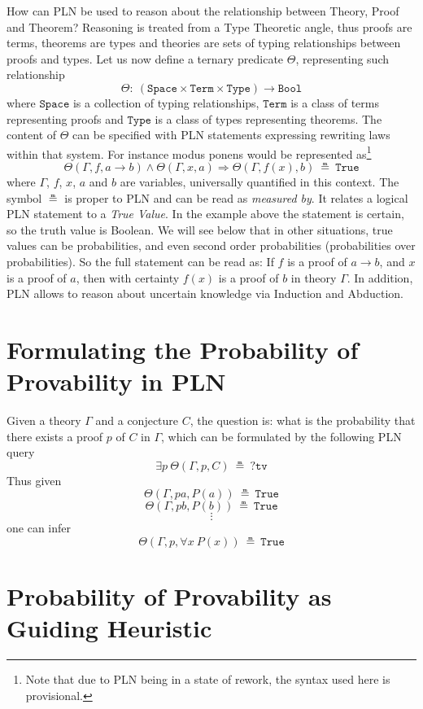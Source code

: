 \documentclass{easychair}
\newcommand{\U}{\Theta}
\newcommand{\Space}{\texttt{Space}}
\newcommand{\Term}{\texttt{Term}}
\newcommand{\Type}{\texttt{Type}}
\newcommand{\Bool}{\texttt{Bool}}
\newcommand{\arrow}{\to}
\newcommand{\limp}{\Rightarrow}
\newcommand{\True}{\texttt{True}}
\begin{document}
How can PLN be used to reason about the relationship between Theory,
Proof and Theorem?  Reasoning is treated from a Type Theoretic angle,
thus proofs are terms, theorems are types and theories are sets of
typing relationships between proofs and types.  Let us now define a
ternary predicate $\U$, representing such relationship
$$\U :\ (\Space \times \Term \times \Type) \arrow \Bool$$ where $\Space$
is a collection of typing relationships, $\Term$ is a class of terms
representing proofs and $\Type$ is a class of types representing
theorems.  The content of $\U$ can be specified with PLN statements
expressing rewriting laws within that system.  For instance modus
ponens would be represented as\footnote{Note that due to PLN being in
a state of rework, the syntax used here is provisional.}
$$\U(\Gamma, f, a \to b) \land \U(\Gamma, x, a) \limp \U(\Gamma, f(x),
b)\ \measeq\ \True$$ where $\Gamma$, $f$, $x$, $a$ and $b$ are
variables, universally quantified in this context.  The symbol
$\measeq$ is proper to PLN and can be read as \emph{measured by}.  It
relates a logical PLN statement to a \emph{True Value}.  In the
example above the statement is certain, so the truth value is Boolean.
We will see below that in other situations, true values can be
probabilities, and even second order probabilities (probabilities over
probabilities).  So the full statement can be read as: If $f$ is a
proof of $a \arrow b$, and $x$ is a proof of $a$, then with certainty
$f(x)$ is a proof of $b$ in theory $\Gamma$.  In addition, PLN allows
to reason about uncertain knowledge via Induction and Abduction.
\section{Formulating the Probability of Provability in PLN}
Given a theory $\Gamma$ and a conjecture $C$, the question is: what is
the probability that there exists a proof $p$ of $C$ in $\Gamma$,
which can be formulated by the following PLN query
$$\exists p\ \U(\Gamma, p, C)\ \measeq\ ?\texttt{tv}$$
Thus given
$$\U(\Gamma, pa, P(a))\ \measeq\ \True$$
$$\U(\Gamma, pb, P(b))\ \measeq\ \True$$
$$\vdots$$
one can infer
$$\U(\Gamma, p, \forall x\ P(x))\ \measeq\ \True$$

\section{Probability of Provability as Guiding Heuristic}

\newpage



\label{sect:bib}
%
%
%


\newpage


\appendix

\end{document}
